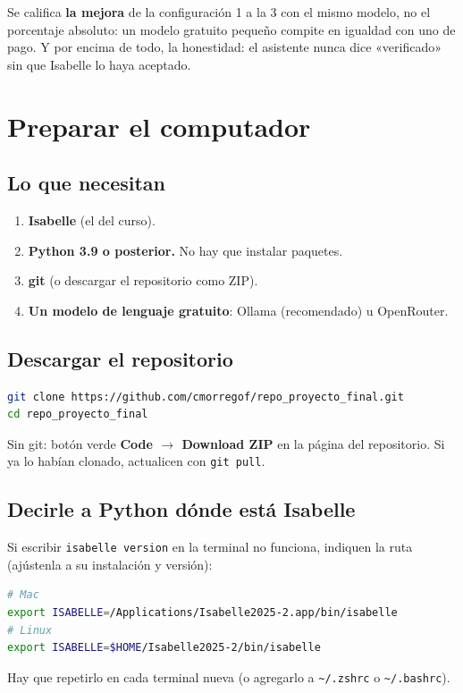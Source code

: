 \documentclass[11pt,a4paper]{article}
\newcommand{\cd}[1]{\texttt{\small #1}}
\begin{document}
Se califica \textbf{la mejora} de la configuración 1 a la 3 con el
mismo modelo, no el porcentaje absoluto: un modelo gratuito pequeño
compite en igualdad con uno de pago. Y por encima de todo, la
honestidad: el asistente nunca dice «verificado» sin que Isabelle lo
haya aceptado.

\section{Preparar el computador}

\subsection{Lo que necesitan}
\begin{enumerate}
  \item \textbf{Isabelle} (el del curso).
  \item \textbf{Python 3.9 o posterior.} No hay que instalar paquetes.
  \item \textbf{git} (o descargar el repositorio como ZIP).
  \item \textbf{Un modelo de lenguaje gratuito}: Ollama (recomendado) u
    OpenRouter.
\end{enumerate}

\subsection{Descargar el repositorio}
\begin{haga}
\begin{lstlisting}[language=bash]
git clone https://github.com/cmorregof/repo_proyecto_final.git
cd repo_proyecto_final
\end{lstlisting}
Sin git: botón verde \textbf{Code $\to$ Download ZIP} en la página del
repositorio. Si ya lo habían clonado, actualicen con \cd{git pull}.
\end{haga}

\subsection{Decirle a Python dónde está Isabelle}
\begin{haga}
Si escribir \cd{isabelle version} en la terminal no funciona, indiquen la
ruta (ajústenla a su instalación y versión):
\begin{lstlisting}[language=bash]
# Mac
export ISABELLE=/Applications/Isabelle2025-2.app/bin/isabelle
# Linux
export ISABELLE=$HOME/Isabelle2025-2/bin/isabelle
\end{lstlisting}
Hay que repetirlo en cada terminal nueva (o agregarlo a \cd{\textasciitilde/.zshrc}
o \cd{\textasciitilde/.bashrc}).
\end{haga}
\end{document}
